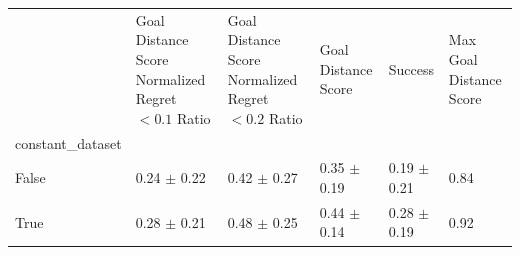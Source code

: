\begin{tabular}{llllll}
\toprule
 & Goal Distance Score Normalized Regret $< 0.1$ Ratio & Goal Distance Score Normalized Regret $< 0.2$ Ratio & Goal Distance Score & Success & Max Goal Distance Score \\
constant_dataset &  &  &  &  &  \\
\midrule
False & 0.24 $\pm$ 0.22 & 0.42 $\pm$ 0.27 & 0.35 $\pm$ 0.19 & 0.19 $\pm$ 0.21 & 0.84 \\
True & 0.28 $\pm$ 0.21 & 0.48 $\pm$ 0.25 & 0.44 $\pm$ 0.14 & 0.28 $\pm$ 0.19 & 0.92 \\
\bottomrule
\end{tabular}
